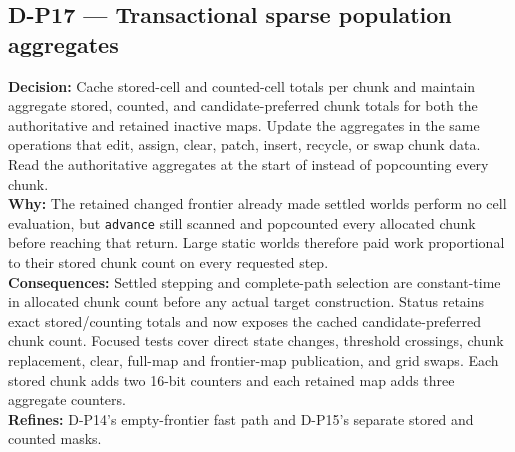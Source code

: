 \subsection*{D-P17 --- Transactional sparse population aggregates}
\begin{decisionbox}[title={D-P17 \quad 2026-08-09}]
\textbf{Decision:} Cache stored-cell and counted-cell totals per chunk and
maintain aggregate stored, counted, and candidate-preferred chunk totals for
both the authoritative and retained inactive maps. Update the aggregates in
the same operations that edit, assign, clear, patch, insert, recycle, or swap
chunk data. Read the authoritative aggregates at the start of
 instead of popcounting every chunk.\\
\textbf{Why:} The retained changed frontier already made settled worlds perform
no cell evaluation, but \texttt{advance} still scanned and popcounted every
allocated chunk before reaching that return. Large static worlds therefore
paid work proportional to their stored chunk count on every requested step.\\
\textbf{Consequences:} Settled stepping and complete-path selection are
constant-time in allocated chunk count before any actual target construction.
Status retains exact stored/counting totals and now exposes the cached
candidate-preferred chunk count. Focused tests cover direct state changes,
threshold crossings, chunk replacement, clear, full-map and frontier-map
publication, and grid swaps. Each stored chunk adds two 16-bit counters and
each retained map adds three aggregate counters.\\
\textbf{Refines:} D-P14's empty-frontier fast path and D-P15's separate stored
and counted masks.
\end{decisionbox}

